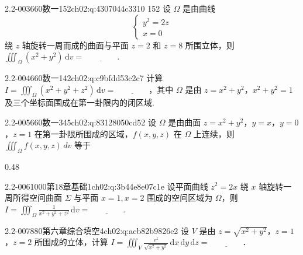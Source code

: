 \begin{q}{2.2-003}{660数一152}{ch02:q:4307044c3310}
152 设 $\Omega$ 是由曲线
\[
\begin{cases}
y^2=2z\\
x=0
\end{cases}
\]
绕 $z$ 轴旋转一周而成的曲面与平面 $z=2$ 和 $z=8$ 所围立体，则
$\displaystyle \iiint_{\Omega}(x^2+y^2)\,\mathrm{d}v=\underline{\hspace{4em}}.$
\end{q}

\begin{q}{2.2-004}{660数一142}{ch02:q:c9bfdd53c2c7}
计算 $\displaystyle I=\iiint_{\Omega}(x^2+y^2+z^2)\,\mathrm{d}v=\underline{\hspace{4em}}$，其中 $\Omega$ 是由 $z=x^2+y^2$，$x^2+y^2=1$ 及三个坐标面围成在第一卦限内的闭区域.
\end{q}

\begin{q}{2.2-005}{660数一345}{ch02:q:83128050cd52}
设 $\Omega$ 是由曲面 $z=x^2+y^2$，$y=x$，$y=0$，$z=1$ 在第一卦限所围成的区域，$f(x,y,z)$ 在 $\Omega$ 上连续，则
$\displaystyle \iiint_{\Omega} f(x,y,z)\,dv$
等于
\begin{opts}{0.48}
\hfill{}\\[0.3ex]
\hfill{}
\end{opts}
\end{q}

\begin{q}{2.2-006}{1000第18章基础1}{ch02:q:3b44e8e07c1e}
设平面曲线 $z^2=2x$ 绕 $x$ 轴旋转一周所得空间曲面 $\Sigma$ 与平面 $x=1,x=2$ 围成的空间区域为 $\Omega$，则
$\displaystyle I=\iiint_{\Omega}\frac{1}{x^2+y^2+z^2}\,\mathrm{d}v=\underline{\hspace{4em}}.$
\end{q}

\begin{q}{2.2-007}{880第六章综合填空4}{ch02:q:acb82b9826e2}
设 $V$ 是由 $z=\sqrt{x^2+y^2}$，$z=1$，$z=2$ 所围成的立体，计算 $\displaystyle I=\iiint_V \frac{e^z}{\sqrt{x^2+y^2}}\,\mathrm{d}x\,\mathrm{d}y\,\mathrm{d}z=\underline{\hspace{4em}}$．
\end{q}

